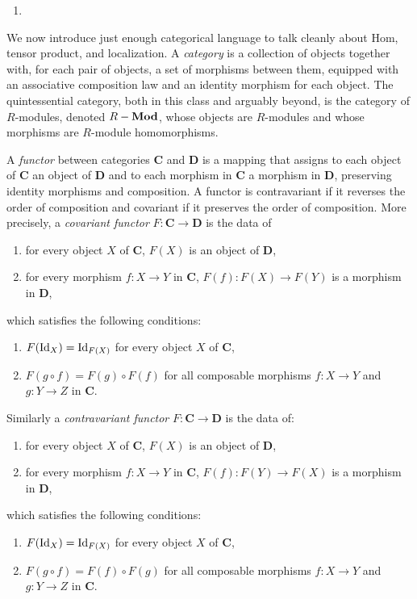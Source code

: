 \documentclass[Notebook.tex]{subfiles}
\begin{document}
\begin{solution}
    \bbni
    \begin{enumerate}
        \item 
    \end{enumerate}
\end{solution}

\hrulefill

We now introduce just enough categorical language to talk cleanly about Hom, tensor product, and localization. A \emph{category} is a collection of objects together with, for each pair of objects, a set of morphisms between them, equipped with an associative composition law and an identity morphism for each object. The quintessential category, both in this class and arguably beyond, is the category of $R$-modules, denoted $R-\operatorname{\textbf{Mod}}$, whose objects are $R$-modules and whose morphisms are $R$-module homomorphisms. 

A \emph{functor} between categories $\textbf{C}$ and $\textbf{D}$ is a mapping that assigns to each object of $\textbf{C}$ an object of $\textbf{D}$ and to each morphism in $\textbf{C}$ a morphism in $\textbf{D}$, preserving identity morphisms and composition. A functor is contravariant if it reverses the order of composition and covariant if it preserves the order of composition. More precisely, a \emph{covariant functor} $F: \textbf{C} \to \textbf{D}$ is the data of
\begin{enumerate}
\item for every object $X$ of $\textbf{C}$, $F(X)$ is an object of $\textbf{D}$,
\item for every morphism $f: X \to Y$ in $\textbf{C}$, $F(f): F(X) \to F(Y)$ is a morphism in $\textbf{D}$,
\end{enumerate}
which satisfies the following conditions:
\begin{enumerate}[label=(\roman*),ref=\theenumi\roman*]
\item $F(\operatorname{Id}_X) = \operatorname{Id}_{F(X)}$ for every object $X$ of $\textbf{C}$,
\item $F(g \circ f) = F(g) \circ F(f)$ for all composable morphisms $f: X \to Y$ and $g: Y \to Z$ in $\textbf{C}$.
\end{enumerate}
Similarly a \emph{contravariant functor} $F:\textbf{C} \to \textbf{D}$ is the data of:
\begin{enumerate}
\item for every object $X$ of $\textbf{C}$, $F(X)$ is an object of $\textbf{D}$,
\item for every morphism $f: X \to Y$ in $\textbf{C}$, $F(f): F(Y) \to F(X)$ is a morphism in $\textbf{D}$,
\end{enumerate}
which satisfies the following conditions:
\begin{enumerate}[label=(\roman*),ref=\theenumi\roman*]
\item $F(\operatorname{Id}_X) = \operatorname{Id}_{F(X)}$ for every object $X$ of $\textbf{C}$,
\item $F(g \circ f) = F(f) \circ F(g)$ for all composable morphisms $f: X \to Y$ and $g: Y \to Z$ in $\textbf{C}$.
\end{enumerate}
\end{document}
